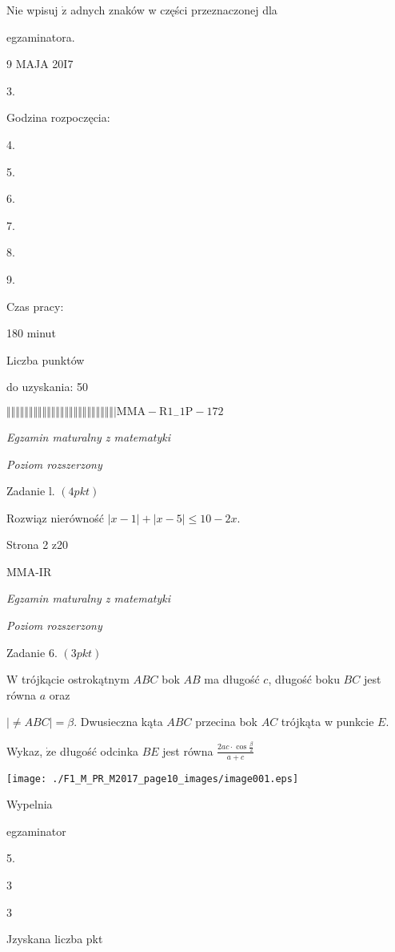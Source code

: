 \documentclass[a4paper,12pt]{article}
\begin{document}
Nie wpisuj $\dot{\mathrm{z}}$ adnych znaków w części przeznaczonej dla

egzaminatora.

9 MAJA 20I7

3.

Godzina rozpoczęcia:

4.

5.

6.

7.

8.

9.

Czas pracy:

180 minut

Liczba punktów

do uzyskania: 50

$\Vert\Vert\Vert\Vert\Vert\Vert\Vert\Vert\Vert\Vert\Vert\Vert\Vert\Vert\Vert\Vert\Vert\Vert\Vert\Vert\Vert\Vert\Vert\Vert|  \mathrm{M}\mathrm{M}\mathrm{A}-\mathrm{R}1_{-}1\mathrm{P}-172$




{\it Egzamin maturalny z matematyki}

{\it Poziom rozszerzony}

Zadanie l. $(4pkt)$

Rozwiąz nierówność $|x-1|+|x-5|\leq 10-2x.$

Strona 2 z20

MMA-IR





{\it Egzamin maturalny z matematyki}

{\it Poziom rozszerzony}

Zadanie 6. $(3pkt)$

$\mathrm{W}$ trójkącie ostrokątnym $ABC$ bok $AB$ ma długość $c$, długość boku $BC$ jest równa $a$ oraz

$|\neq ABC|=\beta$. Dwusieczna kąta $ABC$ przecina bok $AC$ trójkąta w punkcie $E.$

Wykaz, $\dot{\mathrm{z}}\mathrm{e}$ długość odcinka $BE$ jest równa $\displaystyle \frac{2ac\cdot\cos\frac{\beta}{2}}{a+c}$
\begin{center}
\texttt{[image: ./F1\_M\_PR\_M2017\_page10\_images/image001.eps]}
\end{center}
Wypelnia

egzaminator

5.

3

3

Jzyskana liczba pkt
\end{document}
